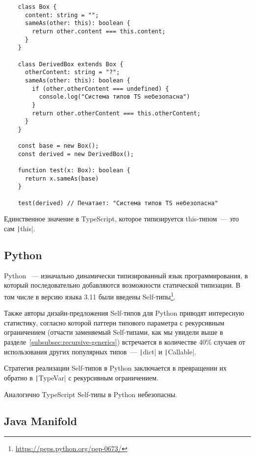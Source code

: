 \begin{verbatim}
    class Box {
      content: string = "";
      sameAs(other: this): boolean {
        return other.content === this.content;
      }
    }

    class DerivedBox extends Box {
      otherContent: string = "?";
      sameAs(other: this): boolean {
        if (other.otherContent === undefined) {
          console.log("Система типов TS небезопасна")
        }
        return other.otherContent === this.otherContent;
      }
    }

    const base = new Box();
    const derived = new DerivedBox();

    function test(x: Box): boolean {
      return x.sameAs(base)
    }

    test(derived) // Печатает: "Система типов TS небезопасна"
\end{verbatim}

Единственное значение в TypeScript, которое типизируется this-типом~--- это сам \texttt|this|.

\subsection{Python}

Python~\cite{sanner1999python} --- изначально динамически типизированный язык программирования, в который последовательно добавляются возможности статической типизации.
В том числе в версию языка 3.11 были введены Self-типы\footnote{\url{https://peps.python.org/pep-0673/}\label{foot:self-pep}}.

Также авторы дизайн-предложения Self-типов для Python приводят интересную статистику, согласно которой паттерн типового параметра с рекурсивным ограничением (отчасти заменяемый Self-типами, как мы увидели выше в разделе~\ref{subsubsec:recursive-generics}) встречается в количестве 40\% случаев от использования других популярных типов~--- \texttt|dict| и \texttt|Callable|.

Стратегия реализации Self-типов в Python заключается в превращении их обратно в \texttt|TypeVar| с рекурсивным ограничением.

Аналогично TypeScript Self-типы в Python небезопасны.

\subsection{Java Manifold}

